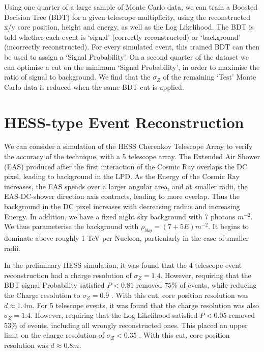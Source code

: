 \documentclass{article}
\begin{document}
Using one quarter of a large sample of Monte Carlo data, we can train a Boosted Decision Tree (BDT) for a given telescope multiplicity, using the reconstructed x/y core position, height and energy, as well as the Log Likelihood. The BDT is told whether each event is \textquoteleft signal' (correctly reconstructed) or \textquoteleft background' (incorrectly reconstructed). For every simulated event, this trained BDT can then be used to assign a \textquoteleft Signal Probability'. On a second quarter of the dataset we can optimise a cut on the minimum \textquoteleft Signal Probability', in order to maximise the ratio of signal to background. We find that the $\sigma_{Z}$ of the remaining \textquoteleft Test' Monte Carlo data is reduced when the same BDT cut is applied.

\section{HESS-type Event Reconstruction}
We can consider a simulation of the HESS Cherenkov Telescope Array to verify the accuracy of the technique, with a 5 telescope array. The Extended Air Shower (EAS) produced after the first interaction of the Cosmic Ray overlaps the DC pixel, leading to background in the LPD. As the Energy of the Cosmic Ray increases, the EAS speads over a larger angular area, and at smaller radii, the EAS-DC-shower direction axis contracts, leading to more overlap. Thus the background in the DC pixel increases with decreasing radius and increasing Energy. In addition, we have a fixed night sky background with 7 photons $m^{-2}$. We thus parameterise the background with 
$ \rho_{bkg}  = (7 + 5E) m^{-2}$. It begins to dominate above roughly 1 TeV per Nucleon, particularly in the case of smaller radii.

In the preliminary HESS simulation, it was found that the 4 telescope event reconstruction had a charge resolution of $\sigma_{Z} = 1.4$. However, requiring that the BDT signal Probability satisfied $P < 0.81$ removed $75 \%$ of events, while reducing the Charge resolution to $\sigma_{Z} = 0.9$ . With this cut, core position resolution was $d \approx 1.4 m $. For 5 telescope events, it was found that the charge resolution was also $\sigma_{Z} = 1.4$. However, requiring that the Log Likelihood satisfied $P < 0.05$ removed $53 \%$ of events, including all wrongly reconstructed ones. This placed an upper limit on the charge resolution of $\sigma_{Z} < 0.35$ . With this cut, core position resolution was $d \approx 0.8 m $.
\end{document}
